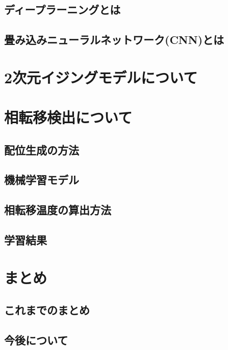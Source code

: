 \documentclass[a4paper,11pt]{jsarticle}
\begin{document}
\subsection{ディープラーニングとは}
\subsection{畳み込みニューラルネットワーク(CNN)とは}
\section{2次元イジングモデルについて}
\section{相転移検出について}
\subsection{配位生成の方法}
\subsection{機械学習モデル}
\subsection{相転移温度の算出方法}
\subsection{学習結果}
\section{まとめ}
\subsection{これまでのまとめ}
\subsection{今後について}

% 
% 
\end{document}

